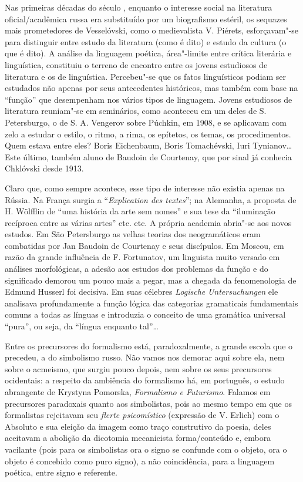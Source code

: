 Nas primeiras décadas do século , enquanto o interesse social na
literatura oficial/acadêmica russa era substituído por um biografismo
estéril, os sequazes mais prometedores de Vesselóvski, como o
medievalista V. Piérets, esforçavam"-se para distinguir entre estudo da
literatura (como é dito) e estudo da cultura (o que é dito). A análise
da linguagem poética, área"-limite entre crítica literária e linguística,
constituiu o terreno de encontro entre os jovens estudiosos de
literatura e os de linguística. Percebeu"-se que os fatos linguísticos
podiam ser estudados não apenas por seus antecedentes históricos, mas
também com base na ``função'' que desempenham nos vários tipos de
linguagem. Jovens estudiosos de literatura reuniam"-se em seminários,
como aconteceu em um deles de S. Petersburgo, o de S. A. Vengerov sobre
Púchkin, em 1908, e se aplicavam com zelo a estudar o estilo, o ritmo, a
rima, os epítetos, os temas, os procedimentos. Quem estava entre eles?
Boris Eichenbaum, Boris Tomachévski, Iuri Tynianov\ldots{} Este último,
também aluno de Baudoin de Courtenay, que por sinal já conhecia
Chklóvski desde 1913.

Claro que, como sempre acontece, esse tipo de interesse não existia
apenas na Rússia. Na França surgia a ``\emph{Explication des textes}'';
na Alemanha, a proposta de H. Wölfflin de ``uma história da arte sem
nomes'' e sua tese da ``iluminação recíproca entre as várias artes''
etc. etc. A própria academia abria"-se aos novos estudos. Em São
Petersburgo as velhas teorias dos neogramáticos eram combatidas por Jan
Baudoin de Courtenay e seus discípulos. Em Moscou, em razão da grande
influência de F. Fortunatov, um linguista muito versado em análises
morfológicas, a adesão aos estudos dos problemas da função e do
significado demorou um pouco mais a pegar, mas a chegada da
fenomenologia de Edmund Husserl foi decisiva. Em suas célebres
\emph{Logische} \emph{Untersuchungen} ele analisava profundamente a
função lógica das categorias gramaticais fundamentais comuns a todas as
línguas e introduzia o conceito de uma gramática universal ``pura'', ou
seja, da ``língua enquanto tal''\ldots{}

Entre os precursores do formalismo está, paradoxalmente, a grande escola
que o precedeu, a do simbolismo russo. Não vamos nos demorar aqui sobre
ela, nem sobre o acmeismo, que surgiu pouco depois, nem sobre os seus
precursores ocidentais: a respeito da ambiência do formalismo há, em
português, o estudo abrangente de Krystyna Pomorska, \emph{Formalismo e
Futurismo}. Falamos em precursores paradoxais quanto aos simbolistas,
pois ao mesmo tempo em que os formalistas rejeitavam seu \emph{flerte
psicomístico} (expressão de V. Erlich) com o Absoluto e sua eleição da
imagem como traço construtivo da poesia, deles aceitavam a abolição da
dicotomia mecanicista forma/conteúdo e, embora vacilante (pois para os
simbolistas ora o signo se confunde com o objeto, ora o objeto é
concebido como puro signo), a não coincidência, para a linguagem
poética, entre signo e referente.

